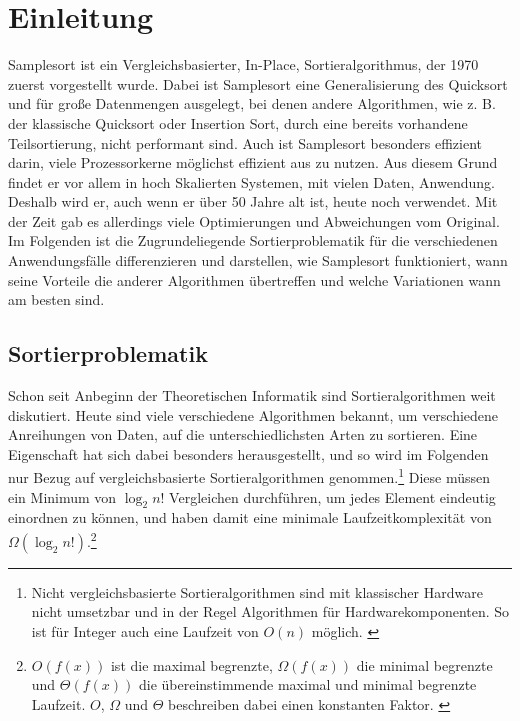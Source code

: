 \section{Einleitung}
	Samplesort ist ein Vergleichsbasierter, In-Place, Sortieralgorithmus, der 1970 zuerst vorgestellt wurde. \autocite{frazer-1970}
	Dabei ist Samplesort eine Generalisierung des Quicksort und für große Datenmengen ausgelegt, bei denen andere Algorithmen, wie z. B. der klassische Quicksort oder Insertion Sort, durch eine bereits vorhandene Teilsortierung, nicht performant sind.
	Auch ist Samplesort besonders effizient darin, viele Prozessorkerne möglichst effizient aus zu nutzen.
	Aus diesem Grund findet er vor allem in hoch Skalierten Systemen, mit vielen Daten, Anwendung.\\
	Deshalb wird er, auch wenn er über 50 Jahre alt ist, heute noch verwendet.
	Mit der Zeit gab es allerdings viele Optimierungen und Abweichungen vom Original.
	Im Folgenden ist die Zugrundeliegende Sortierproblematik für die verschiedenen Anwendungsfälle differenzieren und darstellen, wie Samplesort funktioniert, wann seine Vorteile die anderer Algorithmen übertreffen und welche Variationen wann am besten sind.
	\subsection{Sortierproblematik}
		Schon seit Anbeginn der Theoretischen Informatik sind Sortieralgorithmen weit diskutiert.
		Heute sind viele verschiedene Algorithmen bekannt, um verschiedene Anreihungen von Daten, auf die unterschiedlichsten Arten zu sortieren.
		Eine Eigenschaft hat sich dabei besonders herausgestellt, und so wird im Folgenden nur Bezug auf vergleichsbasierte Sortieralgorithmen genommen.\footnote{Nicht vergleichsbasierte Sortieralgorithmen sind mit klassischer Hardware nicht umsetzbar und in der Regel Algorithmen für Hardwarekomponenten. So ist für Integer auch eine Laufzeit von $O(n)$ möglich. \autocite{abdel-hafeez-2017}}
		Diese müssen ein Minimum von $\log_2{n!}$ Vergleichen durchführen, um jedes Element eindeutig einordnen zu können, und haben damit eine minimale Laufzeitkomplexität von $\Omega(\log_2{n!})$.\footnote{$O(f(x))$ ist die maximal begrenzte, $\Omega(f(x))$ die minimal begrenzte und $\Theta(f(x))$ die übereinstimmende maximal und minimal begrenzte Laufzeit. $O$, $\Omega$ und $\Theta$ beschreiben dabei einen konstanten Faktor. \autocite[4]{sedgewick-1996}}
	
